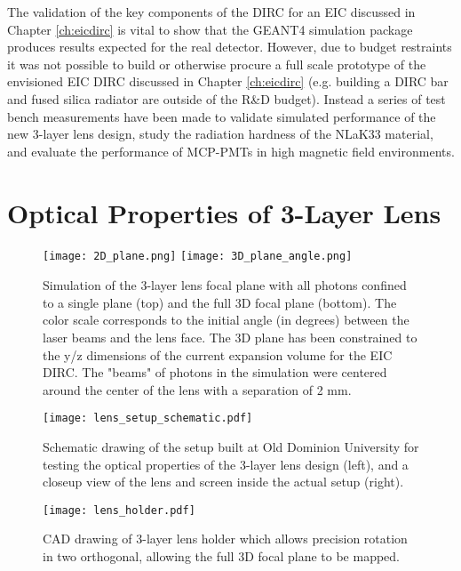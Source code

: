 \label{ch:components}
The validation of the key components of the DIRC for an EIC discussed in Chapter \ref{ch:eicdirc} is vital to show that the GEANT4 simulation package produces results expected for the real detector. However, due to budget restraints it was not possible to build or otherwise procure a full scale prototype of the envisioned EIC DIRC discussed in Chapter \ref{ch:eicdirc} (e.g. building a DIRC bar and fused silica radiator are outside of the R\&D budget). Instead a series of test bench measurements have been made to validate simulated performance of the new 3-layer lens design, study the radiation hardness of the NLaK33 material, and evaluate the performance of MCP-PMTs in high magnetic field environments.

\section{Optical Properties of 3-Layer Lens}
\begin{figure}[!htb]
	\centering
	\texttt{[image: 2D\_plane.png]}
	\texttt{[image: 3D\_plane\_angle.png]}
	\caption{Simulation of the 3-layer lens focal plane with all photons confined to a single plane (top) and the full 3D focal plane (bottom). The color scale corresponds to the initial angle (in degrees) between the laser beams and the lens face. The 3D plane has been constrained to the y/z dimensions of the current expansion volume for the EIC DIRC. The "beams" of photons in the simulation were centered around the center of the lens with a separation of 2 mm.}
	\label{fig:focalplane_sim}
\end{figure}
\begin{figure}[!htb]
	\centering
	\texttt{[image: lens\_setup\_schematic.pdf]}
	\caption{Schematic drawing of the setup built at Old Dominion University for testing the optical properties of the 3-layer lens design (left), and a closeup view of the lens and screen inside the actual setup (right).}
	\label{fig:ODU_setup}
\end{figure}

\begin{figure}[!htb]
	\centering
	\texttt{[image: lens\_holder.pdf]}
	\caption{CAD drawing of 3-layer lens holder which allows precision rotation in two orthogonal, allowing the full 3D focal plane to be mapped.}
	\label{fig:lens_holder}
\end{figure}

